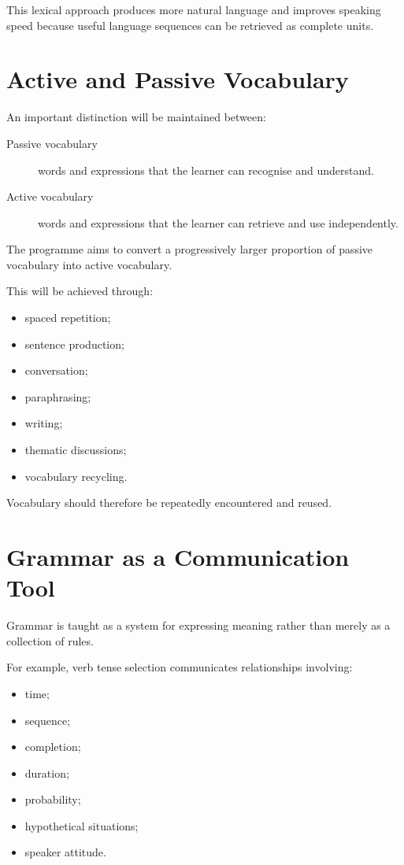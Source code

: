 This lexical approach produces more natural language and improves speaking speed because useful language sequences can be retrieved as complete units.

\section*{Active and Passive Vocabulary}

An important distinction will be maintained between:

\begin{description}

    \item[Passive vocabulary] words and expressions that the learner can recognise and understand.

    \item[Active vocabulary] words and expressions that the learner can retrieve and use independently.

\end{description}

The programme aims to convert a progressively larger proportion of passive vocabulary into active vocabulary.

This will be achieved through:

\begin{itemize}
    \item spaced repetition;
    \item sentence production;
    \item conversation;
    \item paraphrasing;
    \item writing;
    \item thematic discussions;
    \item vocabulary recycling.
\end{itemize}

Vocabulary should therefore be repeatedly encountered and reused.

\section*{Grammar as a Communication Tool}

Grammar is taught as a system for expressing meaning rather than merely as a collection of rules.

For example, verb tense selection communicates relationships involving:

\begin{itemize}
    \item time;
    \item sequence;
    \item completion;
    \item duration;
    \item probability;
    \item hypothetical situations;
    \item speaker attitude.
\end{itemize}

